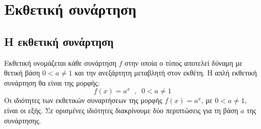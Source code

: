 \chapter{Εκθετική συνάρτηση}
\section{Η εκθετική συνάρτηση}
\orismoi
{}
Εκθετική ονομάζεται κάθε συνάρτηση $ f $ στην οποία ο τύπος αποτελεί δύναμη με θετική βάση $ 0<a\neq1 $ και την ανεξάρτητη μεταβλητή στον εκθέτη. Η απλή εκθετική συνάρτηση θα είναι της μορφής:
\[ f(x)=a^x\;\;,\;\;0<a\neq1 \]
\thewrhmata
{}
Οι ιδιότητες των εκθετικών συναρτήσεων της μορφής $ f(x)=a^x $, με $ 0<a\neq1 $, είναι οι εξής. Σε ορισμένες ιδιότητες διακρίνουμε δύο περιπτώσεις για τη βάση $ a $ της συνάρτησης.
